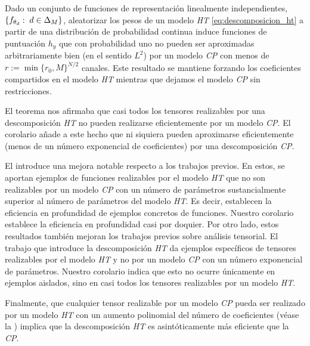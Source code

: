 \begin{corolario} \label{corol:corol_principal}

    Dado un conjunto de funciones de representación linealmente independientes, $\{ f_{\theta_d}: \; d \in \Delta_{M} \}$, aleatorizar los pesos de un modelo \textit{HT} \eqref{eq:descomposicion_ht} a partir de una distribución de probabilidad continua induce funciones de puntuación $h_y$ que con probabilidad uno no pueden ser aproximadas arbitrariamente bien (en el sentido $L^2$) por un modelo \textit{CP} con menos de $r := \min \{r_0, M \}^{N/2}$ canales. Este resultado se mantiene forzando los coeficientes compartidos en el modelo \textit{HT} mientras que dejamos el modelo \textit{CP} sin restricciones.

\end{corolario}

El teorema nos afirmaba que casi todos los tensores realizables por una descomposición \textit{HT} no pueden realizarse eficientemente por un modelo \textit{CP}. El corolario añade a este hecho que ni siquiera pueden aproximarse eficientemente (menos de un número exponencial de coeficientes) por una descomposición \textit{CP}.

El  introduce una mejora notable respecto a los trabajos previos. En estos, se aportan ejemplos de funciones realizables por el modelo \textit{HT} que no son realizables por un modelo \textit{CP} con un número de parámetros sustancialmente superior al número de parámetros del modelo \textit{HT}. Es decir, establecen la eficiencia en profundidad de ejemplos concretos de funciones. Nuestro corolario establece la eficiencia en profundidad casi por doquier. Por otro lado, estos resultados también mejoran los trabajos previos sobre análisis tensorial. El trabajo que introduce la descomposición \textit{HT} \cite{matematicas:descomposicion_ht} da ejemplos específicos de tensores realizables por el modelo \textit{HT} y no por un modelo \textit{CP} con un número exponencial de parámetros. Nuestro corolario indica que esto no ocurre únicamente en ejemplos aislados, sino en casi todos los tensores realizables por un modelo \textit{HT}.

Finalmente, que cualquier tensor realizable por un modelo \textit{CP} pueda ser realizado por un modelo \textit{HT} con un aumento polinomial del número de coeficientes (véase la ) implica que la descomposición \textit{HT} es asintóticamente más eficiente que la \textit{CP}.

